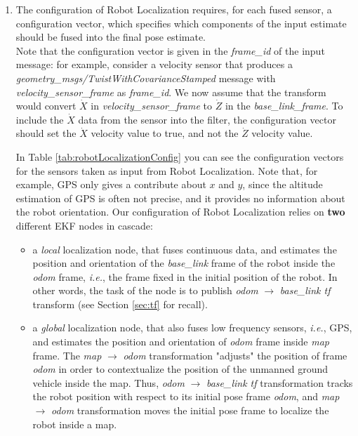 \begin{enumerate}
	\item The configuration of Robot Localization requires, for each fused sensor, a configuration vector, which specifies which components of the input estimate should be fused into the final pose estimate.
	\\Note that the configuration vector is given in the \textit{frame\_id} of the input message: for example, consider a velocity sensor that produces a \textit{geometry\_msgs/TwistWithCovarianceStamped} message with  \textit{velocity\_sensor\_frame} as \textit{frame\_id}. We now assume that the transform would convert $\dot{X}$ in \textit{velocity\_sensor\_frame} to $\dot{Z}$ in the \textit{base\_link\_frame}. To include the $\dot{X}$ data from the sensor into the filter, the configuration vector should set the $\dot{X}$ velocity value to true, and not the $\dot{Z}$ velocity value. 
\par In Table \ref{tab:robotLocalizationConfig} you can see the configuration vectors for the sensors taken as input from Robot Localization. Note that, for example, GPS only gives a contribute about $x$ and $y$, since the altitude estimation of GPS is often not precise, and it provides no information about the robot orientation. Our configuration of Robot Localization relies on \textbf{two} different \ac{EKF} nodes in cascade:
	\begin{itemize}
		\item a \textit{local} localization node, that fuses continuous data, and estimates the position and orientation of the \textit{base\_link} frame of the robot inside the \textit{odom} frame, \textit{i.e.}, the frame fixed in the initial position of the robot. In other words, the task of the node is to publish \textit{odom} $\rightarrow$ \textit{base\_link tf} transform (see Section \ref{sec:tf} for recall). 
		\item a \textit{global} localization node, that also fuses low frequency sensors, \textit{i.e.}, GPS, and estimates the position and orientation of \textit{odom} frame inside \textit{map} frame. The \textit{map} $\rightarrow$ \textit{odom} transformation "adjusts" the position of frame \textit{odom} in order to contextualize the position of the unmanned ground vehicle inside the map. Thus,  \textit{odom} $\rightarrow$ \textit{base\_link tf} transformation tracks the robot position with respect to its initial pose frame \textit{odom}, and \textit{map} $\rightarrow$ \textit{odom} transformation moves the initial pose frame to localize the robot inside a map.
 	\end{itemize}

\end{enumerate}
